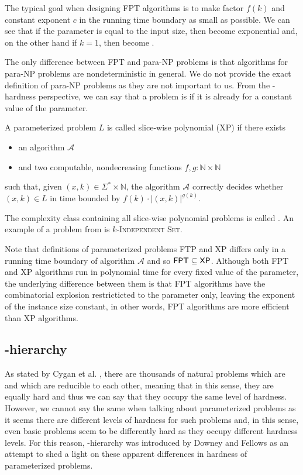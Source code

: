 The typical goal when designing FPT algorithms is to make factor $f(k)$ and constant exponent $c$
in the running time boundary as small as possible.
We can see that if the parameter is equal to the input size, then \FPT become exponential and,
on the other hand if $k = 1$, then \FPT become \Po \cite{Koutensky2020}.

The only difference between FPT and para-NP problems is that algorithms for para-NP problems are
nondeterministic in general.
We do not provide the exact definition of para-NP problems as they are not important to us.
From the \pNP-hardness perspective, we can say that a problem is \pNPh if it is \NPh already for a constant value of the parameter.

\begin{definition}[XP]
    A parameterized problem $L$ is called slice-wise polynomial (XP) if there exists
    \begin{itemize}
        \item an algorithm $\mathcal{A}$
        \item and two computable, nondecreasing functions $f,g : \mathbb{N} \times \mathbb{N}$
    \end{itemize}
    such that, given $(x,k) \in \Sigma^* \times \mathbb{N}$,
    the algorithm $\mathcal{A}$ correctly decides whether $(x, k) \in L$ in time bounded by
    $f(k) \cdot |(x,k)|^{g(k)}$.
\end{definition}

The complexity class containing all slice-wise polynomial problems is called \XP.
An example of a problem from \XP is $k$-\textsc{Independent Set}.

Note that definitions of parameterized problems FTP and XP differs only in a running time boundary of algorithm $\mathcal{A}$
and so $\textsf{FPT} \subseteq \textsf{XP}$.
Although both FPT and XP algorithms run in polynomial time for every fixed value of the parameter,
the underlying difference between them is that FPT algorithms have the combinatorial explosion
restricticted to the parameter only, leaving the exponent of the instance size constant, in other words,
FPT algorithms are more efficient than XP algorithms.


\subsection{\W-hierarchy}

As stated by Cygan et al. \cite[p.~423]{Cygan2015},
there are thousands of natural problems which are \NPc and which are reducible to each other,
meaning that in this sense, they are equally hard and thus we can say that
they occupy the same level of hardness.
However, we cannot say the same when talking about parameterized problems as it seems there are
different levels of hardness for such problems and, in this sense, even basic problems
seem to be differently hard as they occupy different hardness levels.
For this reason, \W-hierarchy was introduced by Downey and Fellows \cite{Downey1999} as
an attempt to shed a light on these apparent differences in hardness of parameterized problems. 

